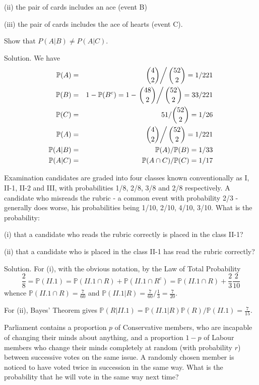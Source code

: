 (ii) the pair of cards includes an ace (event B)

(iii) the pair of cards includes the ace of hearts (event C).

Show that $P(A|B)\neq P(A|C)$.



Solution. We have 
\begin{eqnarray}
\mathbb{P}(A) & = & \left.\binom{4}{2}\right/\binom{52}{2}=1/221 \\
\mathbb{P}(B) & = & 1-\mathbb{P}(B^c)=1-\left.\binom{48}{2}\right/\binom{52}{2}=33/221 \\
\mathbb{P}(C) & = & 51 /\binom{52}{2}=1/26\\
\mathbb{P}(A) & = & \left.\binom{4}{2}\right/\binom{52}{2}=1/221 \\
\mathbb{P}(A|B) & = & \mathbb{P}(A)/\mathbb{P}(B)=1/33 \\
\mathbb{P}(A|C) & = & \mathbb{P}(A\cap C)/\mathbb{P}(C)=1/17 
\end{eqnarray}


\item Examination candidates are graded into four classes known conventionally as I, II-1, II-2 and III, with probabilities 1/8, 2/8, 3/8 and 2/8 respectively. A candidate who misreads the rubric - a common event with probability 2/3 - generally does worse, his probabilities being 1/10, 2/10, 4/10, 3/10. What is the probability:

(i) that a candidate who reads the rubric correctly is placed in the class II-1?

(ii) that a candidate who is placed in the class II-1 has read the rubric correctly?



Solution. For (i), with the obvious notation, by the Law of Total Probability
\begin{equation}
\frac{2}{8}=\mathbb{P}(II.1)=\mathbb{P}(II.1\cap R) + \mathbb{P}(II.1\cap R^c) = \mathbb{P}(II.1\cap R) + \frac{2}{3}\frac{2}{10}
\end{equation}
whence $\mathbb{P}(II.1\cap R)=\frac{7}{60}$ and $\mathbb{P}(II.1| R)=\frac{7}{60}/\frac{1}{3} =\frac{7}{20}$. 

For (ii), Bayes' Theorem gives $\mathbb{P}(R|II.1)=\mathbb{P}(II.1| R)\mathbb{P}(R)/\mathbb{P}(II.1)=\frac{7}{15}$.


\item Parliament contains a proportion $p$ of Conservative members, who are incapable of changing their minds about anything, and a proportion $1-p$ of Labour members who change their minds completely at random (with probability $r$) between successive votes on the same issue. A randomly chosen member is noticed to have voted twice in succession in the same way. What is the probability that he will vote in the same way next time?



